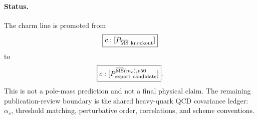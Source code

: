 \paragraph{Status.}
The charm line is promoted from
\[
\boxed{c:[P_{\overline{\rm MS}\ {\rm knockout}}]}
\]
to
\[
\boxed{c:[P_{\rm export\ candidate}^{\overline{\rm MS}(m_c),v50}]}.
\]
This is not a pole-mass prediction and not a final physical claim.  The remaining
publication-review boundary is the shared heavy-quark QCD covariance ledger:
$\alpha_s$, threshold matching, perturbative order, correlations, and scheme
conventions.
